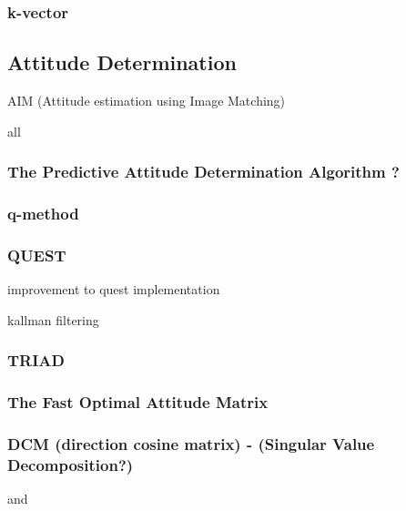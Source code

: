 \documentclass[12pt,a4paper,oneside]{article}
\begin{document}
\subsubsection{k-vector}

\cite{mortari2013k}\par
\cite{mortari1996fast}\par
\cite{mortari2000k}\par

\subsection{Attitude Determination}
\cite{jenssen2011comparison}\par
AIM (Attitude estimation using Image Matching)\cite{delabie2012highly}\par
all \cite{hall2003spacecraft} \cite{markley1999estimate}
\subsubsection{The Predictive Attitude Determination Algorithm ?}
\cite{park2006attitude}
\subsubsection{q-method}
\subsubsection{QUEST}
improvement to quest implementation \cite{RIS_1} \par
kallman filtering \cite{shuster1990kalman}
\subsubsection{TRIAD}
\subsubsection{The Fast Optimal Attitude Matrix}
\subsubsection{DCM (direction cosine matrix) - (Singular Value Decomposition?)}
\cite{juang2003efficient}
 and
\end{document}
